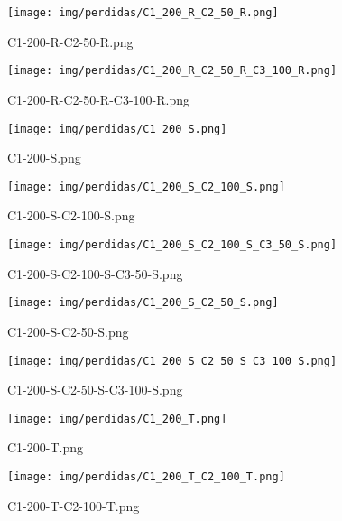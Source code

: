 \begin{figure}[H]
    \centerline{\texttt{[image: img/perdidas/C1\_200\_R\_C2\_50\_R.png]}}
    \caption{C1-200-R-C2-50-R.png}
    \label{fig:C1_200_R_C2_50_R.png}
\end{figure}

\begin{figure}[H]
    \centerline{\texttt{[image: img/perdidas/C1\_200\_R\_C2\_50\_R\_C3\_100\_R.png]}}
    \caption{C1-200-R-C2-50-R-C3-100-R.png}
    \label{fig:C1_200_R_C2_50_R_C3_100_R.png}
\end{figure}

\begin{figure}[H]
    \centerline{\texttt{[image: img/perdidas/C1\_200\_S.png]}}
    \caption{C1-200-S.png}
    \label{fig:C1_200_S.png}
\end{figure}

\begin{figure}[H]
    \centerline{\texttt{[image: img/perdidas/C1\_200\_S\_C2\_100\_S.png]}}
    \caption{C1-200-S-C2-100-S.png}
    \label{fig:C1_200_S_C2_100_S.png}
\end{figure}

\begin{figure}[H]
    \centerline{\texttt{[image: img/perdidas/C1\_200\_S\_C2\_100\_S\_C3\_50\_S.png]}}
    \caption{C1-200-S-C2-100-S-C3-50-S.png}
    \label{fig:C1_200_S_C2_100_S_C3_50_S.png}
\end{figure}

\begin{figure}[H]
    \centerline{\texttt{[image: img/perdidas/C1\_200\_S\_C2\_50\_S.png]}}
    \caption{C1-200-S-C2-50-S.png}
    \label{fig:C1_200_S_C2_50_S.png}
\end{figure}

\begin{figure}[H]
    \centerline{\texttt{[image: img/perdidas/C1\_200\_S\_C2\_50\_S\_C3\_100\_S.png]}}
    \caption{C1-200-S-C2-50-S-C3-100-S.png}
    \label{fig:C1_200_S_C2_50_S_C3_100_S.png}
\end{figure}

\begin{figure}[H]
    \centerline{\texttt{[image: img/perdidas/C1\_200\_T.png]}}
    \caption{C1-200-T.png}
    \label{fig:C1_200_T.png}
\end{figure}

\begin{figure}[H]
    \centerline{\texttt{[image: img/perdidas/C1\_200\_T\_C2\_100\_T.png]}}
    \caption{C1-200-T-C2-100-T.png}
    \label{fig:C1_200_T_C2_100_T.png}
\end{figure}


